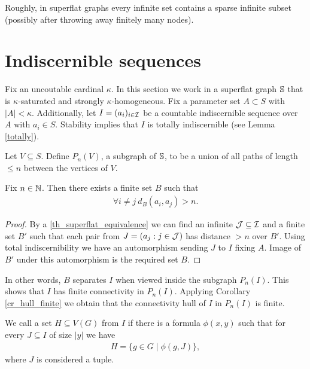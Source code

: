 Roughly, in superflat graphs every infinite set contains a sparse infinite subset (possibly after throwing away finitely many nodes).

\section{Indiscernible sequences}

Fix an uncoutable cardinal $\kappa$.
In this section we work in a superflat graph $\mathbb S$ that is $\kappa$-saturated and strongly $\kappa$-homogeneous.
Fix a parameter set $A \subset S$ with $|A| < \kappa$.
Additionally, let $I = (a_i)_{i \in \operatorname{\mathcal I}}$ be a countable indiscernible sequence over $A$ with $a_i \in S$.
Stability implies that $I$ is totally indiscernible (see Lemma \ref{totally}).

\begin{Definition}
  Let $V \subseteq S$. Define $P_n(V)$, a subgraph of $\mathbb S$, to be a union of all paths of length $\leq n$ between the vertices of $V$.
\end{Definition}

\begin{Lemma} \label{lm_bump}
  Fix $n \in \mathbb{N}$.
  Then there exists a finite set $B$ such that
  \begin{align*}
    \forall i \neq j \ d_B(a_i, a_j) > n.
  \end{align*}
\end{Lemma}

\begin{proof}
  By a \ref{th_superflat_equivalence} we can find an infinite $\operatorname{\mathcal J} \subseteq \operatorname{\mathcal I}$ and a finite set $B'$
  such that each pair from $J = (a_j : j \in \operatorname{\mathcal J})$ has distance $>n$ over $B'$.
  Using total indiscernibility we have an automorphism sending $J$ to $I$ fixing $A$.
  Image of $B'$ under this automorphism is the required set $B$.
\end{proof}

In other words, $B$ separates $I$ when viewed inside the subgraph $P_n(I)$.
This shows that $I$ has finite connectivity in $P_n(I)$.
Applying Corollary \ref{cr_hull_finite} we obtain that the connectivity hull of $I$ in $P_n(I)$ is finite.

\begin{Definition}
  We call a set $H \subseteq V(G)$  from $I$ if there is a formula $\phi(x, y)$ such that for every $J \subseteq I$ of size $|y|$ we have
  \begin{align*}
    H = \{g \in G \mid \phi(g, J)\},
  \end{align*}
  where $J$ is considered a tuple.
\end{Definition}

